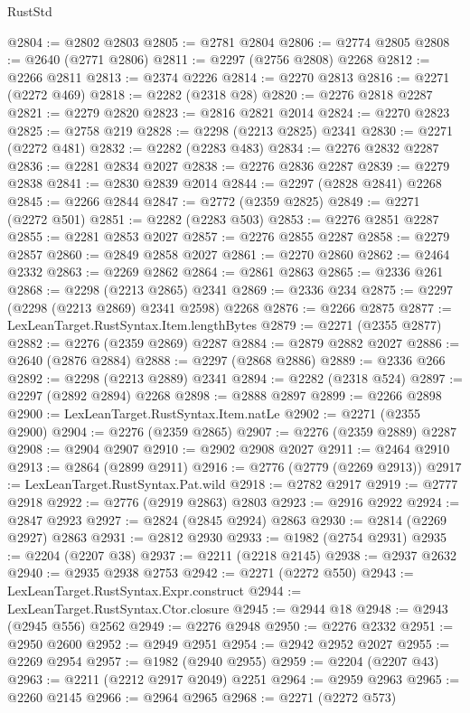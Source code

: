 \begin{lexlean}{RustStd}
\begin{coremodule}
@2804 := @2802 @2803
@2805 := @2781 @2804
@2806 := @2774 @2805
@2808 := @2640 (@2771 @2806)
@2811 := @2297 (@2756 @2808) @2268
@2812 := @2266 @2811
@2813 := @2374 @2226
@2814 := @2270 @2813
@2816 := @2271 (@2272 @469)
@2818 := @2282 (@2318 @28)
@2820 := @2276 @2818 @2287
@2821 := @2279 @2820
@2823 := @2816 @2821 @2014
@2824 := @2270 @2823
@2825 := @2758 @219
@2828 := @2298 (@2213 @2825) @2341
@2830 := @2271 (@2272 @481)
@2832 := @2282 (@2283 @483)
@2834 := @2276 @2832 @2287
@2836 := @2281 @2834 @2027
@2838 := @2276 @2836 @2287
@2839 := @2279 @2838
@2841 := @2830 @2839 @2014
@2844 := @2297 (@2828 @2841) @2268
@2845 := @2266 @2844
@2847 := @2772 (@2359 @2825)
@2849 := @2271 (@2272 @501)
@2851 := @2282 (@2283 @503)
@2853 := @2276 @2851 @2287
@2855 := @2281 @2853 @2027
@2857 := @2276 @2855 @2287
@2858 := @2279 @2857
@2860 := @2849 @2858 @2027
@2861 := @2270 @2860
@2862 := @2464 @2332
@2863 := @2269 @2862
@2864 := @2861 @2863
@2865 := @2336 @261
@2868 := @2298 (@2213 @2865) @2341
@2869 := @2336 @234
@2875 := @2297 (@2298 (@2213 @2869) @2341 @2598) @2268
@2876 := @2266 @2875
@2877 := LexLeanTarget.RustSyntax.Item.lengthBytes
@2879 := @2271 (@2355 @2877)
@2882 := @2276 (@2359 @2869) @2287
@2884 := @2879 @2882 @2027
@2886 := @2640 (@2876 @2884)
@2888 := @2297 (@2868 @2886)
@2889 := @2336 @266
@2892 := @2298 (@2213 @2889) @2341
@2894 := @2282 (@2318 @524)
@2897 := @2297 (@2892 @2894) @2268
@2898 := @2888 @2897
@2899 := @2266 @2898
@2900 := LexLeanTarget.RustSyntax.Item.natLe
@2902 := @2271 (@2355 @2900)
@2904 := @2276 (@2359 @2865)
@2907 := @2276 (@2359 @2889) @2287
@2908 := @2904 @2907
@2910 := @2902 @2908 @2027
@2911 := @2464 @2910
@2913 := @2864 (@2899 @2911)
@2916 := @2776 (@2779 (@2269 @2913))
@2917 := LexLeanTarget.RustSyntax.Pat.wild
@2918 := @2782 @2917
@2919 := @2777 @2918
@2922 := @2776 (@2919 @2863) @2803
@2923 := @2916 @2922
@2924 := @2847 @2923
@2927 := @2824 (@2845 @2924) @2863
@2930 := @2814 (@2269 @2927) @2863
@2931 := @2812 @2930
@2933 := @1982 (@2754 @2931)
@2935 := @2204 (@2207 @38)
@2937 := @2211 (@2218 @2145)
@2938 := @2937 @2632
@2940 := @2935 @2938 @2753
@2942 := @2271 (@2272 @550)
@2943 := LexLeanTarget.RustSyntax.Expr.construct
@2944 := LexLeanTarget.RustSyntax.Ctor.closure
@2945 := @2944 @18
@2948 := @2943 (@2945 @556) @2562
@2949 := @2276 @2948
@2950 := @2276 @2332
@2951 := @2950 @2600
@2952 := @2949 @2951
@2954 := @2942 @2952 @2027
@2955 := @2269 @2954
@2957 := @1982 (@2940 @2955)
@2959 := @2204 (@2207 @43)
@2963 := @2211 (@2212 @2917 @2049) @2251
@2964 := @2959 @2963
@2965 := @2260 @2145
@2966 := @2964 @2965
@2968 := @2271 (@2272 @573)

\end{coremodule}
\end{lexlean}
